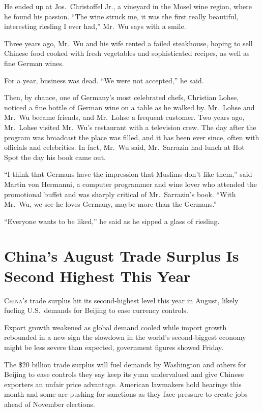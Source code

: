 ﻿\documentclass[12pt]{article}
\begin{document}
He ended up at Jos.~Christoffel Jr., a vineyard in the Mosel wine region, where he found his
passion. ``The wine struck me, it was the first really beautiful, interesting riesling I ever had,''
Mr.~Wu says with a smile.

Three years ago, Mr.~Wu and his wife rented a failed steakhouse, hoping to sell Chinese food cooked
with fresh vegetables and sophisticated recipes, as well as fine German wines.

For a year, business was dead. ``We were not accepted,'' he said.

Then, by chance, one of Germany's most celebrated chefs, Christian Lohse, noticed a fine bottle of
German wine on a table as he walked by. Mr.~Lohse and Mr.~Wu became friends, and Mr.~Lohse a
frequent customer. Two years ago, Mr.~Lohse visited Mr.~Wu's restaurant with a television crew. The
day after the program was broadcast the place was filled, and it has been ever since, often with
officials and celebrities. In fact, Mr.~Wu said, Mr.~Sarrazin had lunch at Hot Spot the day his book
came out.

``I think that Germans have the impression that Muslims don't like them,'' said Martin von Hermanni,
a computer programmer and wine lover who attended the promotional buffet and was sharply critical of
Mr.~Sarrazin's book. ``With Mr.~Wu, we see he loves Germany, maybe more than the Germans.''

``Everyone wants to be liked,'' he said as he sipped a glass of riesling.

\pagebreak
\section{China's August Trade Surplus Is Second Highest This Year}

\lettrine{C}{hina}'s trade surplus hit its second-highest level this year
in August, likely fueling U.S.~demands for Beijing to ease currency controls.

Export growth weakened as global demand cooled while import growth rebounded in a new sign the
slowdown in the world's second-biggest economy might be less severe than expected, government
figures showed Friday.

The \$20 billion trade surplus will fuel demands by Washington and others for Beijing to ease
controls they say keep its yuan undervalued and give Chinese exporters an unfair price advantage.
American lawmakers hold hearings this month and some are pushing for sanctions as they face pressure
to create jobs ahead of November elections.
\end{document}
